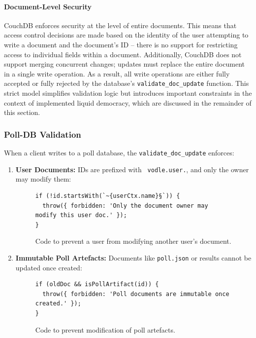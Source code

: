 \paragraph{Document-Level Security}
CouchDB enforces security at the level of entire documents. This means that access control decisions are made based on the identity of the user attempting to write a document and the document's ID -- there is no support for restricting access to individual fields within a document. Additionally, CouchDB does not support merging concurrent changes; updates must replace the entire document in a single write operation. As a result, all write operations are either fully accepted or fully rejected by the database's \texttt{validate\_doc\_update} function. This strict model simplifies validation logic but introduces important constraints in the context of implemented liquid democracy, which are discussed in the remainder of this section.

\subsubsection{Poll-DB Validation}
When a client writes to a poll database, the \texttt{validate\_doc\_update} enforces:

\begin{enumerate}
  \item \textbf{User Documents:} IDs are prefixed with \texttt{~vodle.user.}, and only the owner may modify them:
\begin{figure}[H]
  \centering
\begin{verbatim}
if (!id.startsWith(`~{userCtx.name}§`)) {
  throw({ forbidden: 'Only the document owner may modify this user doc.' });
}
\end{verbatim}    
\caption{Code to prevent a user from modifying another user's document.}
\end{figure}

  \item \textbf{Immutable Poll Artefacts: } Documents like \texttt{poll.json} or results cannot be updated once created:
\begin{figure}[H]
    \begin{verbatim}
if (oldDoc && isPollArtifact(id)) {
  throw({ forbidden: 'Poll documents are immutable once created.' });
}
    \end{verbatim}
\caption{Code to prevent modification of poll artefacts.}
\end{figure}
\end{enumerate}

